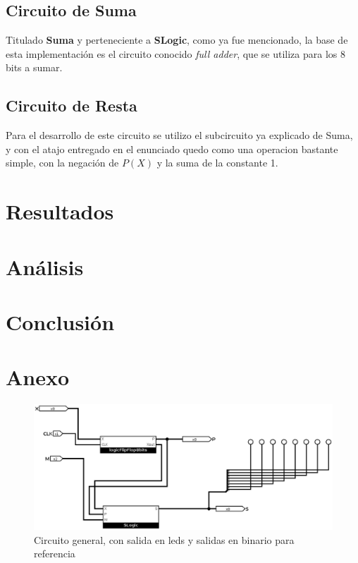 \documentclass[12pt]{article}
\begin{document}
\subsection{Circuito de Suma}

Titulado \textbf{Suma} y perteneciente a \textbf{SLogic}, como ya fue mencionado, la base de esta implementación es el circuito conocido \textit{full adder}, que se utiliza para los 8 bits a sumar.

\subsection{Circuito de Resta}

Para el desarrollo de este circuito se utilizo el subcircuito ya explicado de Suma, y con el atajo entregado en el enunciado quedo como una operacion bastante simple, con la negación de $P(X)$ y la suma de la constante 1.

\section{Resultados}



\section{Análisis}




\section{Conclusión}


\newpage

\section{Anexo}

\begin{figure}[h]
\includegraphics[scale=.4]{main.png}
\caption{Circuito general, con salida en leds y salidas en binario para referencia}
\label{fig:main}
\end{figure}
\end{document}
